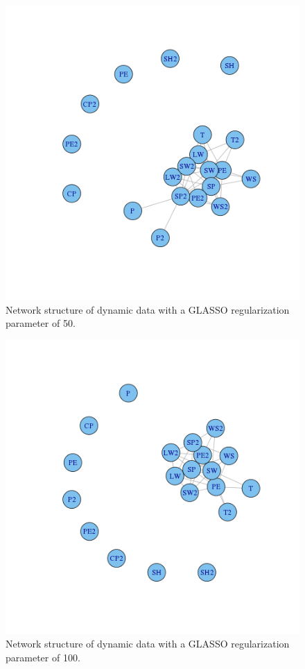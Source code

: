 \documentclass{article}
\begin{document}
\begin{figure}
\includegraphics[bb=0 0 2500 2500,scale=\textwidth]{images/dynamic_50.png}
\caption{Network structure of dynamic data with a GLASSO regularization parameter of 50.}
\label{fig:dynamic_50}
\end{figure}

\begin{figure}
\includegraphics[bb=0 0 2500 2500,scale=\textwidth]{images/dynamic_100.png}
\caption{Network structure of dynamic data with a GLASSO regularization parameter of 100.}
\label{fig:dynamic_100}
\end{figure}
\end{document}
